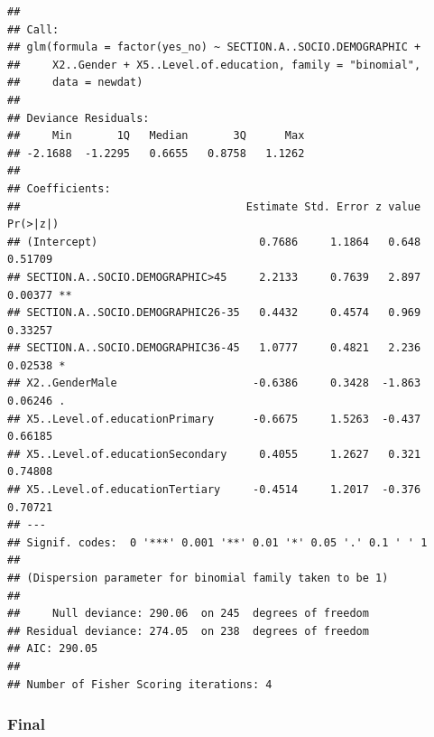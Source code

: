 \documentclass[
]{article}
\begin{document}
\begin{verbatim}
## 
## Call:
## glm(formula = factor(yes_no) ~ SECTION.A..SOCIO.DEMOGRAPHIC + 
##     X2..Gender + X5..Level.of.education, family = "binomial", 
##     data = newdat)
## 
## Deviance Residuals: 
##     Min       1Q   Median       3Q      Max  
## -2.1688  -1.2295   0.6655   0.8758   1.1262  
## 
## Coefficients:
##                                   Estimate Std. Error z value Pr(>|z|)   
## (Intercept)                         0.7686     1.1864   0.648  0.51709   
## SECTION.A..SOCIO.DEMOGRAPHIC>45     2.2133     0.7639   2.897  0.00377 **
## SECTION.A..SOCIO.DEMOGRAPHIC26-35   0.4432     0.4574   0.969  0.33257   
## SECTION.A..SOCIO.DEMOGRAPHIC36-45   1.0777     0.4821   2.236  0.02538 * 
## X2..GenderMale                     -0.6386     0.3428  -1.863  0.06246 . 
## X5..Level.of.educationPrimary      -0.6675     1.5263  -0.437  0.66185   
## X5..Level.of.educationSecondary     0.4055     1.2627   0.321  0.74808   
## X5..Level.of.educationTertiary     -0.4514     1.2017  -0.376  0.70721   
## ---
## Signif. codes:  0 '***' 0.001 '**' 0.01 '*' 0.05 '.' 0.1 ' ' 1
## 
## (Dispersion parameter for binomial family taken to be 1)
## 
##     Null deviance: 290.06  on 245  degrees of freedom
## Residual deviance: 274.05  on 238  degrees of freedom
## AIC: 290.05
## 
## Number of Fisher Scoring iterations: 4
\end{verbatim}

\hypertarget{final}{%
\subsubsection{Final}\label{final}}
\end{document}
